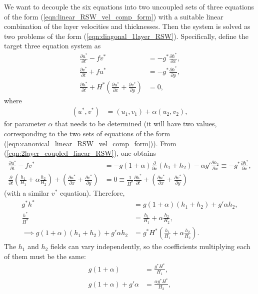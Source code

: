 \documentclass[10pt,reqno]{amsart}
\begin{document}
We want to decouple the six equations into two uncoupled sets of three equations of the form (\ref{eqn:linear_RSW_vel_comp_form}) with a suitable linear combination of the layer velocities and thicknesses.
Then the system is solved as two problems of the form (\ref{eqn:diagonal_1layer_RSW}).
Specifically, define the target three equation system as
\begin{align}
\frac{\partial u^*}{\partial t }  - f v^* &= -g^* \frac{\partial h^*}{\partial x} , \nonumber \\
\frac{\partial v^*}{\partial t }  +f u^* &= -g^* \frac{\partial h^*}{\partial y} , \nonumber  \\
\frac{\partial h^*}{\partial t } + H^* \left( \frac{\partial u^*}{\partial x} + \frac{\partial v^*}{\partial y} \right) &= 0 ,
\label{eqn:canonical_linear_RSW_vel_comp_form}
\end{align}
where
\begin{align}
(u^*, v^* ) &= (u_1, v_1) + \alpha (u_2, v_2) , 
\end{align}
for parameter $\alpha$ that needs to be determined (it will have two values, corresponding to the two sets of equations of the form (\ref{eqn:canonical_linear_RSW_vel_comp_form})).
From (\ref{eqn:2layer_coupled_linear_RSW}), one obtains
\begin{align}
\frac{\partial u^*}{\partial t }  - f v^* &= - g (1 + \alpha) \frac{\partial}{\partial x} (h_1 + h_2) - \alpha g' \frac{\partial h_2}{\partial x}  \equiv  -g^* \frac{\partial h^*}{\partial x}  ,  \\
\frac{\partial}{\partial t } \left( \frac{h_1}{H_1} + \alpha \frac{h_2}{ H_2} \right) + \left( \frac{\partial u^*}{\partial x} + \frac{\partial v^*}{\partial y} \right) &= 0 \equiv
\frac{1}{H^*}\frac{\partial h^*}{\partial t } + \left( \frac{\partial u^*}{\partial x} + \frac{\partial v^*}{\partial y} \right) 
\end{align}
(with a similar $v^*$ equation).
Therefore, 
\begin{align}
g^* h^* & = g( 1+ \alpha) (h_1 + h_2) + g' \alpha h_2, \label{eqn:gstar_hstar} \\
\frac{h^*}{H^*}& = \frac{h_1}{H_1} + \alpha \frac{h_2}{H_2} , \label{eqn:hstar_o_Hstar}\\
\implies
g( 1+ \alpha) (h_1 + h_2) + g' \alpha h_2 &=
g^* H^* \left( \frac{h_1}{H_1} + \alpha \frac{h_2}{H_2} \right) . 
\end{align}
The $h_1$ and $h_2$ fields can vary independently, so the coefficients multiplying each of them must be the same:
\begin{align}
g( 1+ \alpha)  &= \frac{g^* H^*}{H_1} ,  \label{eqn:gstar_Hstar1} \\
g( 1+ \alpha)  + g' \alpha  &= \frac{\alpha g^* H^*}{H_2} ,
\end{align}
\end{document}
